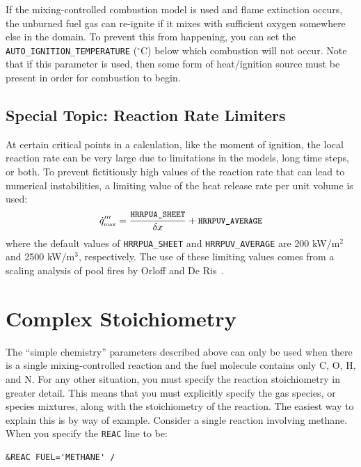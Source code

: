 \documentclass[11pt]{book}
\newcommand{\ct}{\tt\small}
\newcommand{\dx}{\delta x}
\newcommand{\dq}{\dot{q}}
\newcommand{\be}{\begin{equation}}
\newcommand{\ee}{\end{equation}}
\begin{document}
If the mixing-controlled combustion model is used and flame extinction occurs, the unburned fuel gas can re-ignite if it mixes with sufficient oxygen somewhere
else in the domain. To prevent this from happening, you can set the {\ct AUTO\_IGNITION\_TEMPERATURE} ($^\circ$C) below which combustion will not occur.
Note that if this parameter is used, then some form of heat/ignition source must be present in order for combustion to begin.

\subsection{Special Topic: Reaction Rate Limiters}
\label{info:REAC_Limiters}

At certain critical points in a calculation, like the moment of ignition, the local reaction rate can be very large due to limitations in the models, long time
steps, or both. To prevent fictitiously high values of the reaction rate that can lead to numerical instabilities, a limiting value of the heat release rate
per unit volume is used:
\be \dq'''_{\hbox{\tiny max}} = \frac{ \hbox{\ct HRRPUA\_SHEET} }{\dx} + \hbox{\ct HRRPUV\_AVERAGE} \ee
where the default values of {\ct HRRPUA\_SHEET} and {\ct HRRPUV\_AVERAGE} are 200 kW/m$^2$ and 2500 kW/m$^3$, respectively. The use of these limiting values comes from a scaling analysis of pool fires by Orloff and De Ris~\cite{Orloff:19th_Symposium}.




\clearpage

\section{Complex Stoichiometry}
\label{info:REAC_Diagnostics}

The ``simple chemistry'' parameters described above can only be used when there is a single mixing-controlled reaction and the fuel molecule contains only C, O, H, and N.
For any other situation, you must specify the reaction stoichiometry in greater detail. This means that you must explicitly specify the gas species, or species mixtures, along with
the stoichiometry of the reaction. The easiest way to explain this is by way of example. Consider a single reaction involving methane. When you specify the {\ct REAC} line to be:

\footnotesize
\begin{verbatim}
&REAC FUEL='METHANE' /
\end{verbatim} \normalsize
\end{document}
